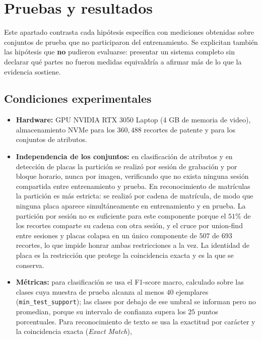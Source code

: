 \section{Pruebas y resultados}

Este apartado contrasta cada hipótesis específica con mediciones obtenidas sobre
conjuntos de prueba que no participaron del entrenamiento. Se explicitan también
las hipótesis que \textbf{no} pudieron evaluarse: presentar un sistema completo
sin declarar qué partes no fueron medidas equivaldría a afirmar más de lo que la
evidencia sostiene.

\subsection{Condiciones experimentales}

\begin{itemize}
    \item \textbf{Hardware:} GPU NVIDIA RTX 3050 Laptop (4 GB de memoria de video),
        almacenamiento NVMe para los $360{,}488$ recortes de patente y para los
        conjuntos de atributos.
    \item \textbf{Independencia de los conjuntos:} en clasificación de
        atributos y en detección de placas la partición se realizó por sesión
        de grabación y por bloque horario, nunca por imagen, verificando que
        no exista ninguna sesión compartida entre entrenamiento y prueba. En
        reconocimiento de matrículas la partición es más estricta: se realizó
        por cadena de matrícula, de modo que ninguna placa aparece
        simultáneamente en entrenamiento y en prueba. La partición por sesión
        no es suficiente para este componente porque el $51\%$ de los recortes
        comparte su cadena con otra sesión, y el cruce por union-find entre
        sesiones y placas colapsa en un único componente de $507$ de $693$
        recortes, lo que impide honrar ambas restricciones a la vez. La
        identidad de placa es la restricción que protege la coincidencia exacta
        y es la que se conserva.
    \item \textbf{Métricas:} para clasificación se usa el F1-score macro,
        calculado sobre las clases cuya muestra de prueba alcanza al menos $40$
        ejemplares (\texttt{min\_test\_support}); las clases por debajo de ese
        umbral se informan pero no promedian, porque su intervalo de confianza
        supera los $25$ puntos porcentuales. Para reconocimiento de texto se usa
        la exactitud por carácter y la coincidencia exacta (\textit{Exact Match}),

\end{itemize}
